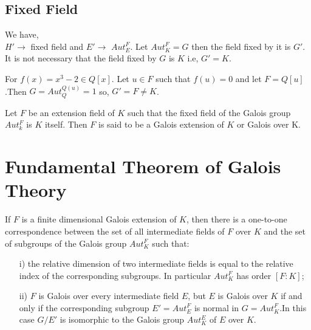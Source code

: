 \subsection{Fixed Field}
We have,\\
\(H' \rightarrow\) fixed field and \(E' \rightarrow\) \(Aut_E^F\).\hspace{5mm} Let \(Aut_K^F = G\) then the field fixed by it is \(G'\). It is not necessary that the field fixed by \(G\) is \(K\) i.e, \(G'=K\).
\vspace{3mm}
\begin{example}
  For \(f(x)=x^3-2 \in Q[x]\). Let \(u \in F\) such that \(f(u)=0\) and let \(F=Q[u]\).Then
  \(G=Aut_Q^{Q(u)}={1}\) so, \hspace{5mm}\(G'=F \neq K\).
\end{example}

\vspace{3mm}
\begin{definition} \cite{hunger}
Let \(F\) be an extension field of \(K\) such that the fixed field of the Galois group \(Aut_k^F\) is \(K\) itself. Then \(F\) is said to be a Galois extension of \(K\) or Galois over K.
\end{definition}

\section{Fundamental Theorem of Galois Theory}
\begin{tcolorbox}
\begin{theorem} \cite{hunger}
  If \(F\) is a finite dimensional Galois extension of \(K\), then there is a one-to-one correspondence between the set of all intermediate fields of \(F\) over \(K\) and the set of subgroups of the Galois group \(Aut_K^F\) such that:
  \begin{enumerate}
  \item[i)] the relative dimension of two intermediate fields is equal to the relative index of the corresponding subgroups. In particular \(Aut_K^F\) has order \([F:K]\);
  \item[ii)] \(F\) is Galois over every intermediate field \(E\), but \(E\) is Galois over \(K\) if and only if the corresponding subgroup \(E'= Aut_E^F\) is normal in \(G=Aut_K^F\).In this case \(G/E'\) is isomorphic to the Galois group \(Aut_K^E\) of \(E\) over \(K\).
  \end{enumerate}
\end{theorem}
\end{tcolorbox}

